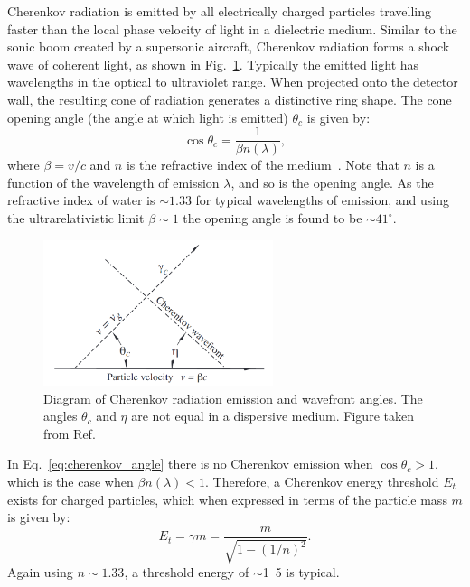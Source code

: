 Cherenkov radiation is emitted by all electrically charged particles travelling faster than the
local phase velocity of light in a dielectric medium. Similar to the sonic boom created by a
supersonic aircraft, Cherenkov radiation forms a shock wave of coherent light, as shown in
Fig.~\ref{fig:cherenkov}. Typically the emitted light has wavelengths in the optical to
ultraviolet range. When projected onto the detector wall, the resulting cone of radiation
generates a distinctive ring shape. The cone opening angle (the angle at which light is emitted)
$\theta_{c}$ is given by:
\begin{equation}
    \cos\theta_{c} = \frac{1}{\beta n(\lambda)},
    \label{eq:cherenkov_angle}
\end{equation}
where $\beta=v/c$ and $n$ is the refractive index of the medium~\cite{particle2020}. Note that $n$
is a function of the wavelength of emission $\lambda$, and so is the opening angle. As the
refractive index of water is $\sim 1.33$ for typical wavelengths of emission, and using the
ultrarelativistic limit $\beta\sim 1$ the opening angle is found to be $\sim41^{\circ}$.

\begin{figure} %
    \includegraphics[width=0.6\textwidth]{diagrams/4-chips/cherenkov.png}
    \caption[Diagram of Cherenkov radiation emission]
    {Diagram of Cherenkov radiation emission and wavefront angles. The angles $\theta_{c}$ and
        $\eta$ are not equal in a dispersive medium. Figure taken from Ref.~\cite{particle2020}}
    \label{fig:cherenkov}
\end{figure}

In Eq.~\ref{eq:cherenkov_angle} there is no Cherenkov emission when $\cos\theta_{c} > 1$, which is
the case when $\beta n(\lambda)<1$. Therefore, a Cherenkov energy threshold $E_{t}$ exists for
charged particles, which when expressed in terms of the particle mass $m$ is given by:
\begin{equation}
    E_{t} = \gamma m = \frac{m}{\sqrt{1-(1/n)^{2}}}.
    \label{eq:cherenkov_threshold}
\end{equation}
Again using $n\sim 1.33$, a threshold energy of $\sim$\unit{1.5}{} is typical.

